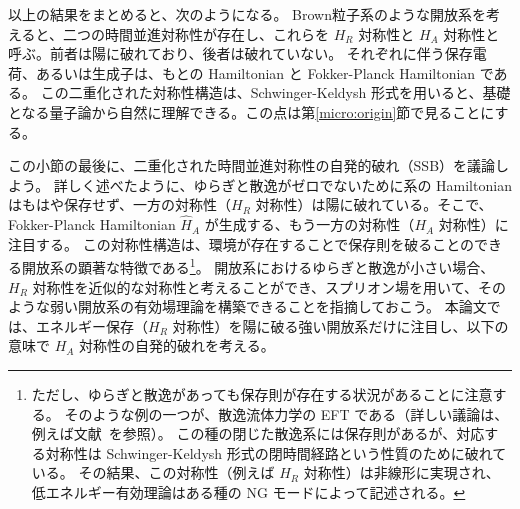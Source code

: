 \medskip
以上の結果をまとめると、次のようになる。
Brown粒子系のような開放系を考えると、二つの時間並進対称性が存在し、これらを $H_R$ 対称性と $H_A$ 対称性と呼ぶ。前者は陽に破れており、後者は破れていない。
それぞれに伴う保存電荷、あるいは生成子は、もとの Hamiltonian と Fokker-Planck Hamiltonian である。
この二重化された対称性構造は、Schwinger-Keldysh 形式を用いると、基礎となる量子論から自然に理解できる。この点は第\ref{micro:origin}節で見ることにする。


\medskip 
この小節の最後に、二重化された時間並進対称性の自発的破れ（SSB）を議論しよう。
詳しく述べたように、ゆらぎと散逸がゼロでないために系の Hamiltonian はもはや保存せず、一方の対称性（$H_R$ 対称性）は陽に破れている。そこで、Fokker-Planck Hamiltonian $\hat{H}_A$ が生成する、もう一方の対称性（$H_A$ 対称性）に注目する。
この対称性構造は、環境が存在することで保存則を破ることのできる開放系の顕著な特徴である\footnote{
ただし、ゆらぎと散逸があっても保存則が存在する状況があることに注意する。
そのような例の一つが、散逸流体力学の EFT である（詳しい議論は、例えば文献~\cite{Crossley:2015evo,Glorioso:2017fpd}を参照）。
この種の閉じた散逸系には保存則があるが、対応する対称性は Schwinger-Keldysh 形式の閉時間経路という性質のために破れている。
その結果、この対称性（例えば $H_R$ 対称性）は非線形に実現され、低エネルギー有効理論はある種の NG モードによって記述される。}。
開放系におけるゆらぎと散逸が小さい場合、$H_R$ 対称性を近似的な対称性と考えることができ、スプリオン場を用いて、そのような弱い開放系の有効場理論を構築できることを指摘しておこう。
本論文では、エネルギー保存（$H_R$ 対称性）を陽に破る強い開放系だけに注目し、以下の意味で $H_A$ 対称性の自発的破れを考える。

